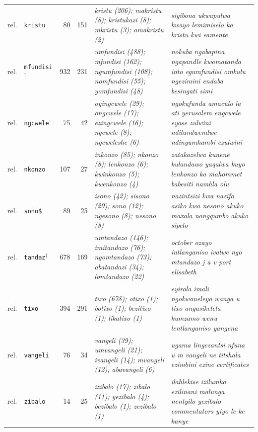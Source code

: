 \begin{table}[h]
\begin{tabular}{@{}llrrp{}p{}@{}}
rel. & \texttt{kristu} & 80 & 151 & \emph{kristu (206); makristu (8); kristukazi (8); mkristu (3); amakristu (2)} & \emph{siyibona ukwapulwa kwayo lemimiselo ka kristu kwi eamente} \\
rel. & \texttt{mfundisi}$^\dagger$ & 932 & 231 & \emph{umfundisi (488); mfundisi (162); ngumfundisi (108); nomfundisi (55); yomfundisi (48)} & \emph{nokuba ngabapina ngapandle kwamatanda into egumfundisi omkulu ngezimini endaba besingati simi} \\
rel. & \texttt{ngcwele} & 75 & 42 & \emph{oyingcwele (29); ongcwele (17); ezingcwele (16); ngcwele (8); ngcweleshe (6)} & \emph{ngokufunda amaculo la ati yerusalem engcwele eyase zulwini ndilundwendwe ndingumhambi ezulwini} \\
rel. & \texttt{nkonzo} & 107 & 27 & \emph{inkonzo (85); nkonzo (8); lenkonzo (6); kwinkonzo (5); kwenkonzo (4)} & \emph{zatakazelwa kunene kulandawo yaqalwa kuyo lenkonzo ka mahommet babesiti namhla olu} \\
rel. & \texttt{sono\$} & 89 & 25 & \emph{isono (42); sisono (20); sono (12); ngesono (8); nesono (8)} & \emph{nazintsizi kwa nazifo asiko kwa nesono akuko maxala nangqumbo akuko sipelo} \\
rel. & \texttt{tandaz}$^\dagger$ & 678 & 169 & \emph{umtandazo (146); imitandazo (76); ngomtandazo (73); abatandazi (34); lomtandazo (22)} & \emph{october ozayo intlanganiso ivalwe ngo mtandazo j a v port elisabeth} \\
rel. & \texttt{tixo} & 394 & 291 & \emph{tixo (678); otixo (1); botixo (1); bezitixo (1); likatixo (1)} & \emph{eyirola imali ngokwaneleyo wanga u tixo angasikelela kumzamo wenu lentlanganiso yangena} \\
rel. & \texttt{vangeli} & 76 & 34 & \emph{vangeli (39); umvangeli (21); ivangeli (14); mvangeli (12); abavangeli (6)} & \emph{ugama lingezantsi nfuna u m vangeli ne titshala ezimbini ezine certificates} \\
rel. & \texttt{zibalo} & 14 & 25 & \emph{izibalo (17); zibalo (11); yezibalo (4); bezibalo (1); zezibalo (1)} & \emph{ilahlekise izilumko ezilinani malunga nentyilo yezibalo commentators yiyo le ke kanye} \\
\bottomrule\end{tabular}\label{tab:audit}\end{table}
